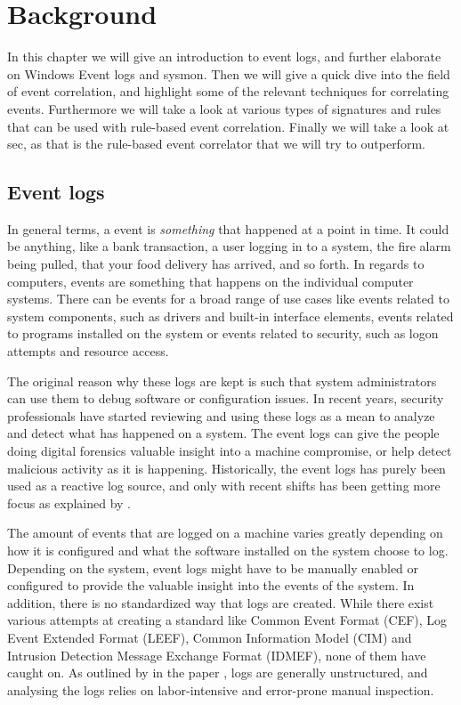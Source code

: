 \chapter{Background}
\label{chap:background}

In this chapter we will give an introduction to event logs, and further elaborate on Windows Event logs and \acrfull{sysmon}.
Then we will give a quick dive into the field of event correlation, and highlight some of the relevant techniques for correlating events.
Furthermore we will take a look at various types of signatures and rules that can be used with rule-based event correlation.
Finally we will take a look at \acrfull{sec}, as that is the rule-based event correlator that we will try to outperform.

\section{Event logs}
\label{sec:event-logs}
In general terms, a event is \textit{something} that happened at a point in time. It could be anything, like a bank transaction, a user logging in to a system, the fire alarm being pulled, that your food delivery has arrived, and so forth.
In regards to computers, events are something that happens on the individual computer systems. There can be events for a broad range of use cases like events related to system components, such as drivers and built-in interface elements, events related to programs installed on the system or events related to security, such as logon attempts and resource access.

The original reason why these logs are kept is such that system administrators can use them to debug software or configuration issues. In recent years, security professionals have started reviewing and using these logs as a mean to analyze and detect what has happened on a system. The event logs can give the people doing digital forensics valuable insight into a machine compromise, or help detect malicious activity as it is happening. Historically, the event logs has purely been used as a reactive log source, and only with recent shifts has been getting more focus as explained by \textcite{He_2017}.

The amount of events that are logged on a machine varies greatly depending on how it is configured and what the software installed on the system choose to log. Depending on the system, event logs might have to be manually enabled or configured to provide the valuable insight into the events of the system.
In addition, there is no standardized way that logs are created. While there exist various attempts at creating a standard like Common Event Format (CEF)\cite{CEF}, Log Event Extended Format (LEEF)\cite{LEEF}, Common Information Model (CIM)\cite{CIM} and Intrusion Detection Message Exchange Format (IDMEF)\cite{IDMEF}, none of them have caught on. As outlined by \textcite{He_2018} in the paper , logs are generally unstructured, and analysing the logs relies on labor-intensive and error-prone manual inspection.

